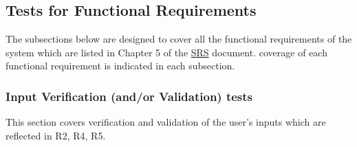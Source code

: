\documentclass[12pt, titlepage]{article}
\begin{document}
\subsection{Tests for Functional Requirements}
\label{func}
The subsections below are designed to cover all the functional requirements of the system which are listed in Chapter 5 of the \href{https://github.com/shmouses/SPDFM/tree/master/docs/SRS}{SRS} document. coverage of each functional requirement is indicated in each subsection.

\subsubsection{Input Verification (and/or Validation) tests}


This section covers verification and validation of the user's inputs which are reflected in R2, R4, R5.
		
\end{document}
